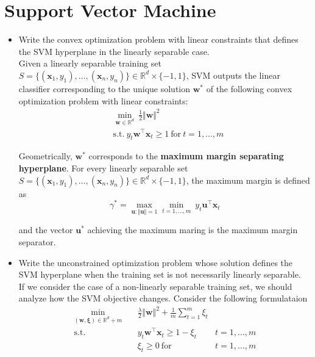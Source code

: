 \newpage
\section{Support Vector Machine}

\begin{itemize}
    
    \item Write the convex optimization problem with linear constraints that defines the SVM hyperplane in the linearly separable case.\\
        
        Given a linearly separable training set $S = \{(\boldsymbol{x}_1, y_1), \dots, (\boldsymbol{x}_n, y_n)\} \in \mathbb{R}^d \times \{-1, 1\}$, SVM outputs the linear classifier corresponding to the unique solution $\boldsymbol{w}^*$ of the following convex optimization problem with linear constraints:
            \begin{align*} 
                & \underset{\boldsymbol{w} \in \mathbb{R}^d}{\min} \ \frac{1}{2} \Vert \boldsymbol{w} \Vert^2 \\
                & \text{s.t.} \ y_t \boldsymbol{w}^\top \boldsymbol{x}_t \geq 1 \ \text{for} \ t = 1, \dots, m 
            \end{align*}

            Geometrically, $\boldsymbol{w}^*$ corresponds to the \textbf{maximum margin separating hyperplane}. For every linearly separable set $S = \{(\boldsymbol{x}_1, y_1), \dots, (\boldsymbol{x}_n, y_n)\} \in \mathbb{R}^d \times \{-1, 1\}$, the maximum margin is defined as 
            $$
            \gamma^* = \underset{\boldsymbol{u} : \Vert \boldsymbol{u} \Vert = 1}{\max} \underset{t = 1, \dots, m}{\min} \ y_t \boldsymbol{u}^\top \boldsymbol{x}_t
            $$ 

            and the vector $\boldsymbol{u}^*$ achieving the maximum maring is the maximum margin separator.

    \item Write the unconstrained optimization problem whose solution defines the SVM hyperplane when the training set is not necessarily linearly separable.\\

        If we consider the case of a non-linearly separable training set, we should analyze how the SVM objective changes. Consider the following formulataion
        \begin{align*}
            \underset{(\boldsymbol{w}, \boldsymbol{\xi}) \in \mathbb{R}^d+m}{\min} \quad & \frac{\lambda}{2} \Vert \boldsymbol{w} \Vert^2 + \frac{1}{m} \sum_{t = 1}^m \xi_t \\
            \text{s.t.} \quad & y_t \boldsymbol{w}^\top \boldsymbol{x}_t \geq 1 - \xi_t & t = 1, \dots, m \\
            & \xi_t \geq 0 \ \text{for} & t = 1, \dots, m
        \end{align*}


\end{itemize}
